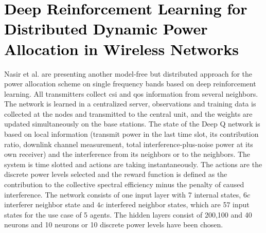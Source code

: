 \section{\textcolor{black}{Deep Reinforcement Learning for Distributed Dynamic Power Allocation in Wireless Networks\cite{Nasir2018}}}
Nasir et al. are presenting another model-free but distributed approach for the power allocation scheme on single frequency bands based on deep reinforcement learning. All transmitters collect \gls{csi} and \gls{qos} information from several neighbors. The network is learned in a centralized server, observations and training data is collected at the nodes and transmitted to the central unit, and the weights are updated simultaneously on the base stations. The state of the Deep Q network is based on local information (transmit power in the last time slot, its contribution ratio, downlink channel measurement, total interference-plus-noise power at its own receiver) and the interference from its neighbors or to the neighbors. The system is time slotted and actions are taking instantaneously. The actions are the discrete power levels selected and the reward function is defined as the contribution to the collective spectral efficiency minus the penalty of caused interference. The network consists of one input layer with 7 internal states, $6c$ interferer neighbor state and $4c$ interfered neighbor states, which are 57 input states for the use case of 5 agents. The hidden layers consist of 200,100 and 40 neurons and 10 neurons or 10 discrete power levels have been chosen.
\ifdefined\SHOWNOTES
